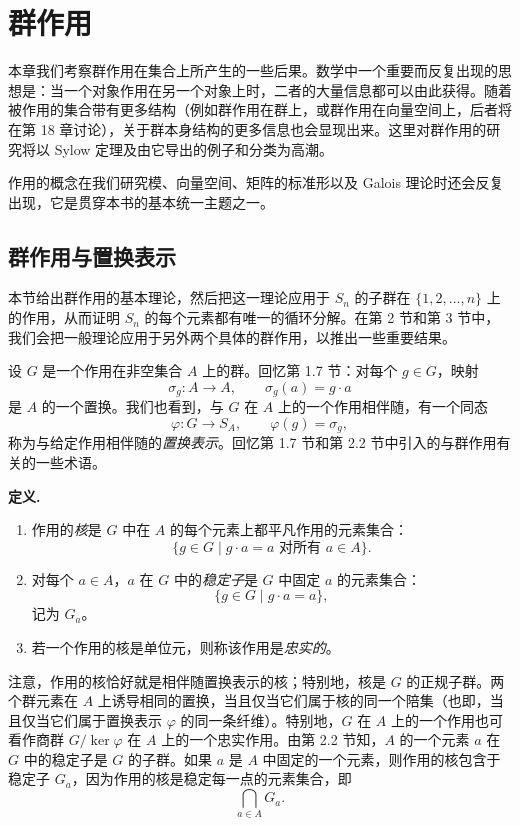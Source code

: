 \chapter{群作用}

本章我们考察群作用在集合上所产生的一些后果。数学中一个重要而反复出现的思想是：当一个对象作用在另一个对象上时，二者的大量信息都可以由此获得。随着被作用的集合带有更多结构（例如群作用在群上，或群作用在向量空间上，后者将在第 18 章讨论），关于群本身结构的更多信息也会显现出来。这里对群作用的研究将以 Sylow 定理及由它导出的例子和分类为高潮。

作用的概念在我们研究模、向量空间、矩阵的标准形以及 Galois 理论时还会反复出现，它是贯穿本书的基本统一主题之一。

\section{群作用与置换表示}

本节给出群作用的基本理论，然后把这一理论应用于 $S_n$ 的子群在 $\{1,2,\ldots,n\}$ 上的作用，从而证明 $S_n$ 的每个元素都有唯一的循环分解。在第 2 节和第 3 节中，我们会把一般理论应用于另外两个具体的群作用，以推出一些重要结果。

设 $G$ 是一个作用在非空集合 $A$ 上的群。回忆第 1.7 节：对每个 $g\in G$，映射
\[
  \sigma_g:A\to A,
  \qquad \sigma_g(a)=g\cdot a
\]
是 $A$ 的一个置换。我们也看到，与 $G$ 在 $A$ 上的一个作用相伴随，有一个同态
\[
  \varphi:G\to S_A,
  \qquad \varphi(g)=\sigma_g,
\]
称为与给定作用相伴随的\emph{置换表示}。回忆第 1.7 节和第 2.2 节中引入的与群作用有关的一些术语。

\noindent\textbf{定义.}
\begin{enumerate}[label=(\arabic*)]
  \item 作用的\emph{核}是 $G$ 中在 $A$ 的每个元素上都平凡作用的元素集合：
  \[
    \{g\in G\mid g\cdot a=a\text{ 对所有 }a\in A\}.
  \]
  \item 对每个 $a\in A$，$a$ 在 $G$ 中的\emph{稳定子}是 $G$ 中固定 $a$ 的元素集合：
  \[
    \{g\in G\mid g\cdot a=a\},
  \]
  记为 $G_a$。
  \item 若一个作用的核是单位元，则称该作用是\emph{忠实的}。
\end{enumerate}

注意，作用的核恰好就是相伴随置换表示的核；特别地，核是 $G$ 的正规子群。两个群元素在 $A$ 上诱导相同的置换，当且仅当它们属于核的同一个陪集（也即，当且仅当它们属于置换表示 $\varphi$ 的同一条纤维）。特别地，$G$ 在 $A$ 上的一个作用也可看作商群 $G/\ker\varphi$ 在 $A$ 上的一个忠实作用。由第 2.2 节知，$A$ 的一个元素 $a$ 在 $G$ 中的稳定子是 $G$ 的子群。如果 $a$ 是 $A$ 中固定的一个元素，则作用的核包含于稳定子 $G_a$，因为作用的核是稳定每一点的元素集合，即
\[
  \bigcap_{a\in A}G_a.
\]

